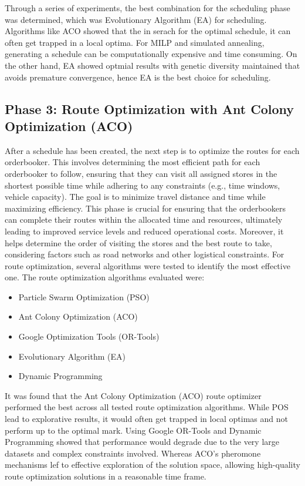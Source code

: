Through a series of experiments, the best combination for the scheduling phase was determined, which was Evolutionary Algorithm (EA) for scheduling.
Algorithms like ACO showed that the in serach for the optimal schedule, it can often get trapped in a local optima. For MILP and simulated annealing, 
generating a schedule can be computationally expensive and time consuming. On the other hand, EA showed optmial results with genetic diversity maintained that
avoids premature convergence, hence EA is the best choice for scheduling.

\subsection{Phase 3: Route Optimization with Ant Colony Optimization (ACO)}
After a schedule has been created, the next step is to optimize the routes for each orderbooker. This involves determining the most efficient path for each orderbooker to follow, ensuring that they can visit all assigned stores in the shortest possible time while adhering to any constraints (e.g., time windows, vehicle capacity). The goal is to minimize travel distance and time while maximizing efficiency.
This phase is crucial for ensuring that the orderbookers can complete their routes within the allocated time and resources, ultimately leading to improved service levels and reduced operational costs.
Moreover, it helps determine the order of visiting the stores and the best route to take, considering factors such as road networks and other logistical constraints.
For route optimization, several algorithms were tested to identify the most effective one. The route optimization algorithms evaluated were:

\begin{itemize}
    \item Particle Swarm Optimization (PSO)
    \item Ant Colony Optimization (ACO)
    \item Google Optimization Tools (OR-Tools)
    \item Evolutionary Algorithm (EA)
    \item Dynamic Programming
\end{itemize}

It was found that the Ant Colony Optimization (ACO) route optimizer performed the best across all tested route optimization algorithms.
While POS lead to explorative results, it would often get trapped in local optimas and not perform up to the optimal mark. Using Google OR-Tools and 
Dynamic Programming showed that performance would degrade due to the very large datasets and complex constraints involved. Whereas ACO's 
pheromone mechanisms lef to effective exploration of the solution space, allowing high-quality route optimization solutions in a reasonable time frame.


